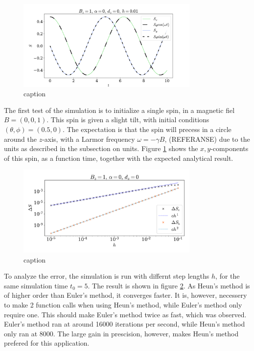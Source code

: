 \documentclass{article}
\begin{document}
    \begin{figure}
        \centering
        \includegraphics[width=0.8\textwidth]{../plots/single.pdf}
        \caption{caption}
        \label{single spin}
    \end{figure}
    The first test of the simulation is to initialize a single spin, in a magnetic fiel $B = (0, 0, 1)$. This spin is given a slight tilt, with initial conditions $(\theta, \phi) = (0.5, 0)$. The expectation is that the spin will precess in a circle around the $z$-axis, with a Larmor frequency $\omega = -\gamma B$, (REFERANSE) due to the units as described in the subsection on units. Figure \ref{single spin} shows the $x,y$-components of this spin, as a function time, together with the expected analytical result.

    \begin{figure}
        \centering
        \includegraphics[width=0.8\textwidth]{../plots/err.pdf}
        \caption{caption}
        \label{error}
    \end{figure}

    
    To analyze the error, the simulation is run with differnt step lengths $h$, for the same simulation time $t_0 = 5$. The result is shown in figure \ref{error}. As Heun's method is of higher order than Euler's method, it converges faster. It is, however, necessery to make 2 function calls when using Heun's method, while Euler's method only require one. This should make Euler's method twice as fast, which was observed. Euler's method ran at around 16000 iterations per second, while Heun's method only ran at 8000. The large gain in prescision, however, makes Heun's method prefered for this application. 
\end{document}
